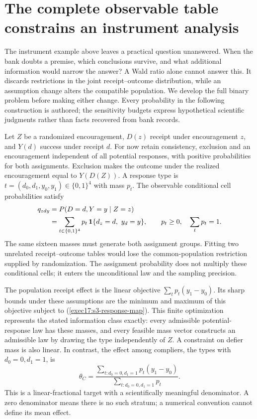 \section{The complete observable table constrains an instrument analysis}
\label{exec17:s3-sensitivity}

The instrument example above leaves a practical question unanswered. When the
bank doubts a premise, which conclusions survive, and what additional
information would narrow the answer? A Wald ratio alone cannot answer this.
It discards restrictions in the joint receipt--outcome distribution, while
an assumption change alters the compatible population. We develop the full
binary problem before making either change. Every probability in the following
construction is authored; the sensitivity budgets express hypothetical
scientific judgments rather than facts recovered from bank records.
\citep{exec17_s3_sensitivity}

Let $Z$ be a randomized encouragement, $D(z)$ receipt under encouragement $z$,
and $Y(d)$ success under receipt $d$. For now retain consistency, exclusion
and an encouragement independent of all potential responses, with positive
probabilities for both assignments. Exclusion makes the outcome under the
realized encouragement equal to $Y(D(Z))$. A response type is
$t=(d_0,d_1,y_0,y_1)\in\{0,1\}^4$ with mass $p_t$. The observable
conditional cell probabilities satisfy
\begin{align}
 q_{zdy}
 &=P(D=d,Y=y\mid Z=z) \notag\\
 &=\sum_{t\in\{0,1\}^4}
      p_t\,{\bf1}\{d_z=d,\ y_d=y\}, \qquad
 p_t\geq0,\quad \sum_t p_t=1 .
 \label{exec17:s3-response-map}
\end{align}
The same sixteen masses must generate both assignment groups. Fitting two
unrelated receipt--outcome tables would lose the common-population
restriction supplied by randomization. The assignment probability does not
multiply these conditional cells; it enters the unconditional law and the
sampling precision.

The population receipt effect is the linear objective
$\sum_t p_t(y_1-y_0)$. Its sharp bounds under these assumptions are the
minimum and maximum of this objective subject to
(\ref{exec17:s3-response-map}). This finite optimization represents the
stated information class exactly: every admissible potential-response law
has these masses, and every feasible mass vector constructs an admissible
law by drawing the type independently of $Z$. A constraint on defier mass
is also linear. In contrast, the effect among compliers, the types with
$d_0=0,d_1=1$, is
\[
 \theta_C=
 \frac{\sum_{t:d_0=0,d_1=1}p_t(y_1-y_0)}
      {\sum_{t:d_0=0,d_1=1}p_t}.
\]
This is a linear-fractional target with a scientifically meaningful
denominator. A zero denominator means there is no such stratum; a
numerical convention cannot define its mean effect.

